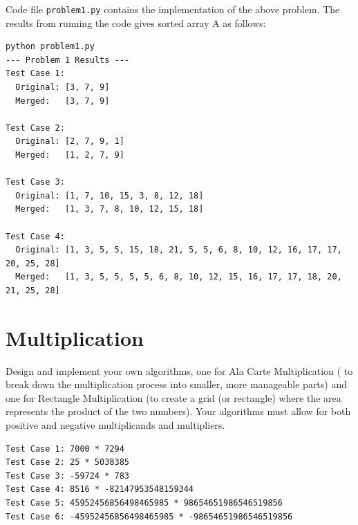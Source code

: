 \documentclass[11pt, a4paper]{article}
\begin{document}




    

Code file \texttt{problem1.py} contains the implementation of the above problem. The results from running the code gives sorted array A as follows:
\begin{verbatim}
python problem1.py 
--- Problem 1 Results ---
Test Case 1: 
  Original: [3, 7, 9]
  Merged:   [3, 7, 9]

Test Case 2: 
  Original: [2, 7, 9, 1]
  Merged:   [1, 2, 7, 9]

Test Case 3: 
  Original: [1, 7, 10, 15, 3, 8, 12, 18]
  Merged:   [1, 3, 7, 8, 10, 12, 15, 18]

Test Case 4: 
  Original: [1, 3, 5, 5, 15, 18, 21, 5, 5, 6, 8, 10, 12, 16, 17, 17, 20, 25, 28]
  Merged:   [1, 3, 5, 5, 5, 5, 6, 8, 10, 12, 15, 16, 17, 17, 18, 20, 21, 25, 28]
\end{verbatim}


\newpage
\section{Multiplication}
Design and implement your own algorithms, one for Ala Carte Multiplication ( to break down the multiplication process into smaller, more manageable parts) and one for Rectangle Multiplication (to create a grid (or rectangle) where the area represents the product of the two numbers). Your algorithms must allow for both positive and negative multiplicands and multipliers.
\begin{verbatim}
Test Case 1: 7000 * 7294
Test Case 2: 25 * 5038385
Test Case 3: -59724 * 783
Test Case 4: 8516 * -82147953548159344
Test Case 5: 45952456856498465985 * 98654651986546519856
Test Case 6: -45952456856498465985 * -98654651986546519856
\end{verbatim}
\end{document}
